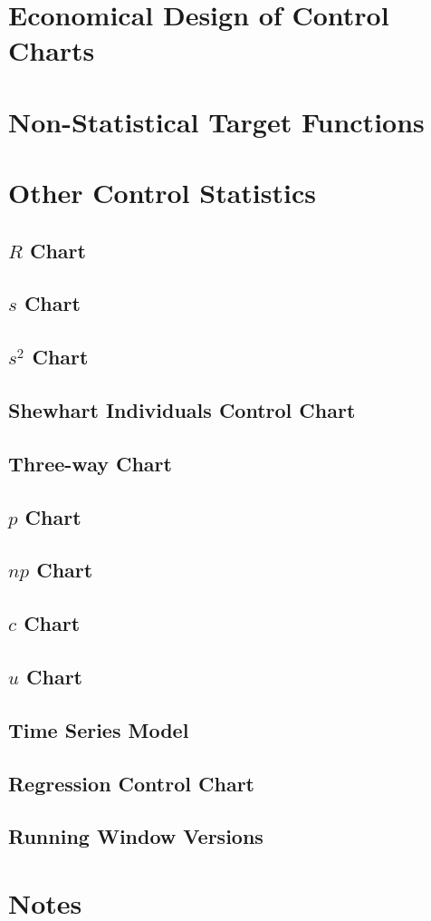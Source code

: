 \section{Economical Design of Control Charts}
\label{sec:economical_considerations}






\section{Non-Statistical Target Functions}






\section{Other Control Statistics}
\subsection{$R$ Chart}
\subsection{$s$ Chart}
\subsection{$s^2$ Chart}
\subsection{Shewhart Individuals Control Chart}
\subsection{Three-way Chart}
\subsection{$p$ Chart}
\subsection{$np$ Chart}
\subsection{$c$ Chart}
\subsection{$u$ Chart}
\subsection{Time Series Model}
\subsection{Regression Control Chart}
\subsection{Running Window Versions}




\section{Notes}


